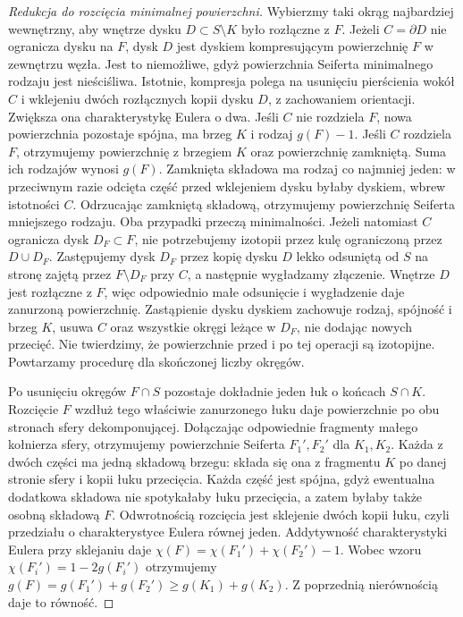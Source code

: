 \begin{proof}[Redukcja do rozcięcia minimalnej powierzchni]
Wybierzmy taki okrąg najbardziej wewnętrzny,
aby wnętrze dysku $D\subset S\setminus K$
było rozłączne z $F$. Jeżeli $C=\partial D$
nie ogranicza dysku na $F$, dysk $D$ jest
dyskiem kompresującym powierzchnię $F$
w zewnętrzu węzła. Jest to niemożliwe,
gdyż powierzchnia Seiferta minimalnego rodzaju
jest nieściśliwa. Istotnie, kompresja polega na
usunięciu pierścienia wokół $C$ i wklejeniu dwóch
rozłącznych kopii dysku $D$, z zachowaniem orientacji.
Zwiększa ona charakterystykę Eulera o dwa.
Jeśli $C$ nie rozdziela $F$, nowa powierzchnia pozostaje
spójna, ma brzeg $K$ i rodzaj $g(F)-1$.
Jeśli $C$ rozdziela $F$, otrzymujemy powierzchnię
z brzegiem $K$ oraz powierzchnię zamkniętą.
Suma ich rodzajów wynosi $g(F)$. Zamknięta składowa
ma rodzaj co najmniej jeden: w przeciwnym razie
odcięta część przed wklejeniem dysku byłaby dyskiem,
wbrew istotności $C$. Odrzucając zamkniętą składową,
otrzymujemy powierzchnię Seiferta mniejszego rodzaju.
Oba przypadki przeczą minimalności.
Jeżeli natomiast $C$ ogranicza dysk $D_F\subset F$,
nie potrzebujemy izotopii przez kulę ograniczoną
przez $D\cup D_F$. Zastępujemy dysk $D_F$
przez kopię dysku $D$ lekko odsuniętą od $S$
na stronę zajętą przez $F\setminus D_F$ przy $C$,
a następnie wygładzamy złączenie. Wnętrze $D$
jest rozłączne z $F$, więc odpowiednio małe
odsunięcie i wygładzenie daje zanurzoną powierzchnię.
Zastąpienie dysku dyskiem zachowuje rodzaj, spójność
i brzeg $K$, usuwa $C$ oraz wszystkie okręgi
leżące w $D_F$, nie dodając nowych przecięć.
Nie twierdzimy, że powierzchnie przed i po tej
operacji są izotopijne. Powtarzamy procedurę dla
skończonej liczby okręgów.

Po usunięciu okręgów $F\cap S$ pozostaje
dokładnie jeden łuk o końcach $S\cap K$.
Rozcięcie $F$ wzdłuż tego właściwie
zanurzonego łuku daje powierzchnie po obu
stronach sfery dekomponującej. Dołączając
odpowiednie fragmenty małego kołnierza
sfery, otrzymujemy powierzchnie Seiferta
$F_1',F_2'$ dla $K_1,K_2$.
Każda z dwóch części ma jedną składową brzegu:
składa się ona z fragmentu $K$ po danej stronie
sfery i kopii łuku przecięcia. Każda część jest
spójna, gdyż ewentualna dodatkowa składowa
nie spotykałaby łuku przecięcia, a zatem byłaby
także osobną składową $F$.
Odwrotnością rozcięcia jest sklejenie dwóch kopii
łuku, czyli przedziału o charakterystyce Eulera
równej jeden. Addytywność charakterystyki Eulera
przy sklejaniu daje
$\chi(F)=\chi(F_1')+\chi(F_2')-1$.
Wobec wzoru $\chi(F_i')=1-2g(F_i')$
otrzymujemy
$g(F)=g(F_1')+g(F_2')\ge g(K_1)+g(K_2)$.
Z poprzednią nierównością daje to równość.
\end{proof}


